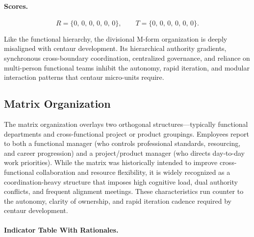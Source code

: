 \documentclass[11pt, a4paper, twocolumn]{article} %
\begin{document}
\paragraph{Scores.}

\[
R = \{0,\,0,\,0,\,0,\,0,\,0\},
\qquad
T = \{0,\,0,\,0,\,0,\,0,\,0\}.
\]

Like the functional hierarchy, the divisional M-form organization is deeply
misaligned with centaur development. Its hierarchical authority gradients,
synchronous cross-boundary coordination, centralized governance, and reliance on
multi-person functional teams inhibit the autonomy, rapid iteration, and modular
interaction patterns that centaur micro-units require.

\newpage
\subsection*{Matrix Organization}

The matrix organization overlays two orthogonal structures---typically functional
departments and cross-functional project or product groupings. Employees report
to both a functional manager (who controls professional standards, resourcing,
and career progression) and a project/product manager (who directs day-to-day
work priorities). While the matrix was historically intended to improve cross-
functional collaboration and resource flexibility, it is widely recognized as a
coordination-heavy structure that imposes high cognitive load, dual authority
conflicts, and frequent alignment meetings. These characteristics run counter to
the autonomy, clarity of ownership, and rapid iteration cadence required by
centaur development.

\paragraph{Indicator Table With Rationales.}
\end{document}
